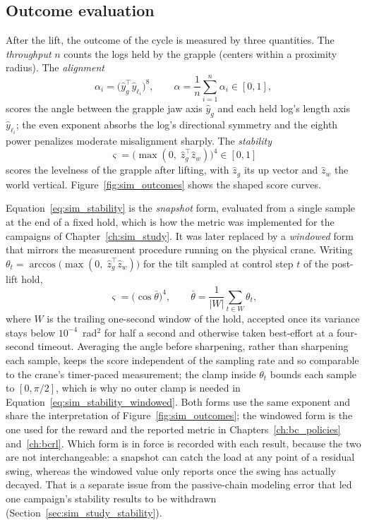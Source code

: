 \subsection{Outcome evaluation}
\label{sec:sim_outcome}

After the lift, the outcome of the cycle is measured by three quantities.
The \emph{throughput} $n$ counts the logs held by the grapple (centers within
a proximity radius). The \emph{alignment}
\begin{equation}
  \alpha_i = \big( \hat{y}_g^{\top} \hat{y}_{\ell_i} \big)^{8}, \qquad
  \alpha = \frac{1}{n} \sum_{i=1}^{n} \alpha_i \in [0, 1],
\end{equation}
scores the angle between the grapple jaw axis $\hat{y}_g$ and each held log's
length axis $\hat{y}_{\ell_i}$; the even exponent absorbs the log's
directional symmetry and the eighth power penalizes moderate misalignment
sharply. The \emph{stability}
\begin{equation}
  \varsigma = \big( \max(0,\; \hat{z}_g^{\top} \hat{z}_w) \big)^{4} \in [0, 1]
  \label{eq:sim_stability}
\end{equation}
scores the levelness of the grapple after lifting, with $\hat{z}_g$ its up
vector and $\hat{z}_w$ the world vertical. Figure~\ref{fig:sim_outcomes}
shows the shaped score curves.

Equation~\eqref{eq:sim_stability} is the \emph{snapshot} form, evaluated from
a single sample at the end of a fixed hold, which is how the metric was
implemented for the campaigns of Chapter~\ref{ch:sim_study}. It was later
replaced by a \emph{windowed} form that mirrors the measurement procedure
running on the physical crane. Writing
$\theta_t = \arccos\big(\max(0,\; \hat{z}_g^{\top} \hat{z}_w)\big)$ for the
tilt sampled at control step $t$ of the post-lift hold,
\begin{equation}
  \varsigma = \big( \cos \bar{\theta} \big)^{4}, \qquad
  \bar{\theta} = \frac{1}{|W|} \sum_{t \in W} \theta_t ,
  \label{eq:sim_stability_windowed}
\end{equation}
where $W$ is the trailing one-second window of the hold, accepted once its
variance stays below $10^{-4}$~rad$^2$ for half a second and otherwise taken
best-effort at a four-second timeout. Averaging the angle before sharpening,
rather than sharpening each sample, keeps the score independent of the
sampling rate and so comparable to the crane's timer-paced measurement; the
clamp inside $\theta_t$ bounds each sample to $[0, \pi/2]$, which is why no
outer clamp is needed in
Equation~\eqref{eq:sim_stability_windowed}. Both forms use the same exponent
and share the interpretation of Figure~\ref{fig:sim_outcomes}; the windowed
form is the one used for the reward and the reported metric in
Chapters~\ref{ch:bc_policies} and~\ref{ch:bcrl}. Which form is in force is
recorded with each result, because the two are not interchangeable: a
snapshot can catch the load at any point of a residual swing, whereas the
windowed value only reports once the swing has actually decayed. That is a
separate issue from the passive-chain modeling error that led one campaign's
stability results to be withdrawn (Section~\ref{sec:sim_study_stability}).

